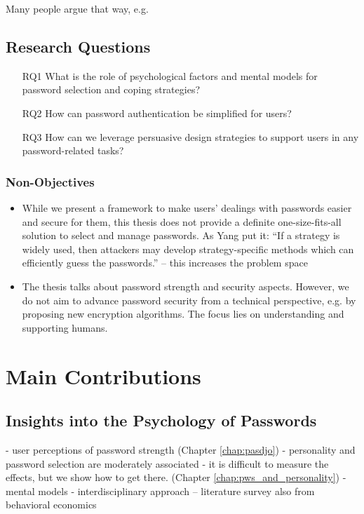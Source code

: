 Many people argue that way, e.g. \cite{Herley2012PersistenceOfPasswords}

\subsection{Research Questions}
\begin{itemize}
	\item[RQ1] What is the role of psychological factors and mental models for password selection and coping strategies?
	\item[RQ2] How can password authentication be simplified for users? 
	\item[RQ3] How can we leverage persuasive design strategies to support users in any password-related tasks?
\end{itemize}


\subsubsection{Non-Objectives}\label{sec:intro:non_objectives}

\begin{itemize}
	\item While we present a framework to make users' dealings with passwords easier and secure for them, this thesis does not provide a definite one-size-fits-all solution to select and manage passwords. As Yang \etal put it: ``If a strategy is widely used, then attackers may develop strategy-specific methods which can efficiently guess the passwords.'' -- this increases the problem space 
	\item The thesis talks about password strength and security aspects. However, we do not aim to advance password security from a technical perspective, e.g. by proposing new encryption algorithms. The focus lies on understanding and supporting humans. 
\end{itemize}


\section{Main Contributions}\label{sec:intro:contributions}

\subsection{Insights into the Psychology of Passwords}
- user perceptions of password strength (Chapter \ref{chap:pasdjo})
- personality and password selection are moderately associated
- it is difficult to measure the effects, but we show how to get there. (Chapter \ref{chap:pws_and_personality})
- mental models 
- interdisciplinary approach -- literature survey also from behavioral economics

